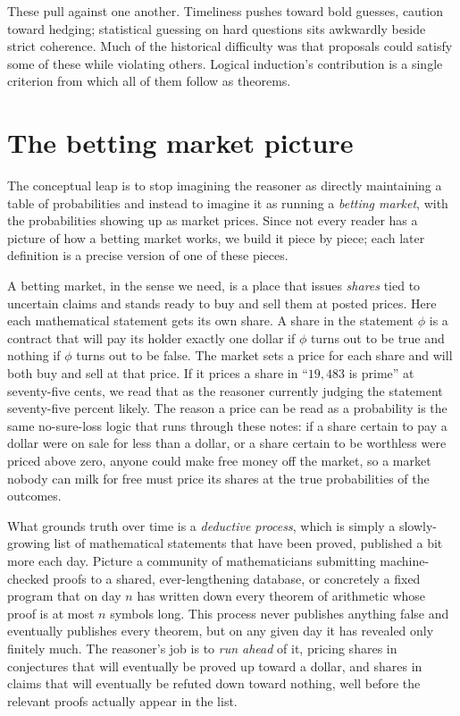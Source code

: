 \documentclass[10pt]{article}
\theoremstyle{definition}
\theoremstyle{remark}
\begin{document}
These pull against one another. Timeliness pushes toward bold guesses, caution toward hedging; statistical guessing on hard questions sits awkwardly beside strict coherence. Much of the historical difficulty was that proposals could satisfy some of these while violating others. Logical induction's contribution is a single criterion from which all of them follow as theorems.

\section{The betting market picture}
\label{sec:market}

The conceptual leap is to stop imagining the reasoner as directly maintaining a table of probabilities and instead to imagine it as running a \emph{betting market}, with the probabilities showing up as market prices. Since not every reader has a picture of how a betting market works, we build it piece by piece; each later definition is a precise version of one of these pieces.

A betting market, in the sense we need, is a place that issues \emph{shares} tied to uncertain claims and stands ready to buy and sell them at posted prices. Here each mathematical statement gets its own share. A share in the statement $\phi$ is a contract that will pay its holder exactly one dollar if $\phi$ turns out to be true and nothing if $\phi$ turns out to be false. The market sets a price for each share and will both buy and sell at that price. If it prices a share in ``$19{,}483$ is prime'' at seventy-five cents, we read that as the reasoner currently judging the statement seventy-five percent likely. The reason a price can be read as a probability is the same no-sure-loss logic that runs through these notes: if a share certain to pay a dollar were on sale for less than a dollar, or a share certain to be worthless were priced above zero, anyone could make free money off the market, so a market nobody can milk for free must price its shares at the true probabilities of the outcomes.

What grounds truth over time is a \emph{deductive process}, which is simply a slowly-growing list of mathematical statements that have been proved, published a bit more each day. Picture a community of mathematicians submitting machine-checked proofs to a shared, ever-lengthening database, or concretely a fixed program that on day $n$ has written down every theorem of arithmetic whose proof is at most $n$ symbols long. This process never publishes anything false and eventually publishes every theorem, but on any given day it has revealed only finitely much. The reasoner's job is to \emph{run ahead} of it, pricing shares in conjectures that will eventually be proved up toward a dollar, and shares in claims that will eventually be refuted down toward nothing, well before the relevant proofs actually appear in the list.
\end{document}
